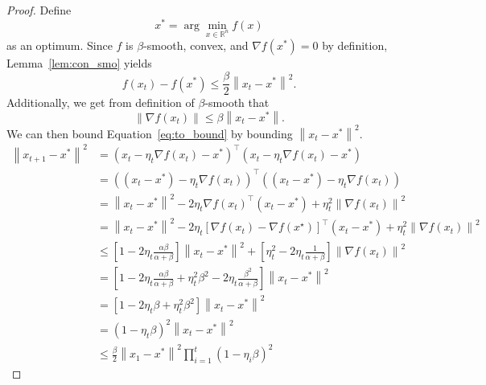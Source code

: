 \documentclass{article}
\newcommand{\R}{\mathbb R}
\newcommand{\norm}[1]{\left\| #1 \right\| }
\theoremstyle{definition}
\begin{document}
\begin{proof}
    Define
    \begin{equation}
        x^* = \arg \min_{x \in \R^n} f(x)
    \end{equation} as an optimum.
    Since $f$ is $\beta$-smooth, convex, and
    $\nabla f(x^*) = 0$ by definition, Lemma~\ref{lem:con_smo} yields
    \begin{equation}
        \label{eq:to_bound}
        f(x_t) - f(x^*) \leq \frac{\beta}{2} \norm{x_t - x^*}^2.
    \end{equation}
    Additionally, we get from definition of $\beta$-smooth that 
    \begin{equation}
        \norm{\nabla f(x_t)} \leq \beta \norm{x_t - x^*}.
    \end{equation}
    We can then bound Equation~\ref{eq:to_bound} by bounding $\norm{x_t - x^*}^2$.
    \begin{equation}
        \begin{aligned}
            \norm{x_{t + 1} - x^*}^2 &= {\left( x_{t} - \eta_t \nabla f(x_t) - x^*
            \right)}^\intercal \left( x_{t} - \eta_t \nabla f(x_t) - x^* \right)
            \\
            &= {\left( (x_{t} - x^*) - \eta_t \nabla f(x_t) 
            \right)}^\intercal \left( (x_{t}-x^*) - \eta_t \nabla f(x_t) \right)
            \\
            &= \norm{x_t - x^*}^2 - 2\eta_t {\nabla
            f(x_t)}^\intercal (x_t - x^*) + \eta_t^2 \norm{\nabla f(x_t)}^2 \\
            &= \norm{x_t - x^*}^2 - 2\eta_t {[\nabla
            f(x_t) - \nabla f(x^\star)]}^\intercal (x_t - x^*) + \eta_t^2
            \norm{\nabla f(x_t)}^2 \\
            &\leq \left[ 1 - 2\eta_t \frac{\alpha \beta}{\alpha + \beta}
            \right]\norm{x_t - x^*}^2 + \left[  \eta_t^2  - 2\eta_t\frac{1}{\alpha +
            \beta} \right]\norm{\nabla f(x_t)}^2\\
            &= \left[ 1 - 2\eta_t \frac{\alpha \beta}{\alpha + \beta}
              + \eta_t^2\beta^2  - 2\eta_t\frac{\beta^2}{\alpha +
            \beta} \right]\norm{x_t - x^*}^2 \\
            &= \left[ 1 - 2\eta_t \beta 
              + \eta_t^2\beta^2  \right]\norm{x_t - x^*}^2 \\
            &= {\left( 1 -  \eta_t\beta  \right)}^2\norm{x_t - x^*}^2 \\
            &\leq \frac{\beta}{2} \norm{x_1 - x^*}^2\prod_{i = 1}^t {\left( 1 - \eta_i \beta
        \right)}^{2} 
        \end{aligned}
    \end{equation}
\end{proof}
\end{document}

